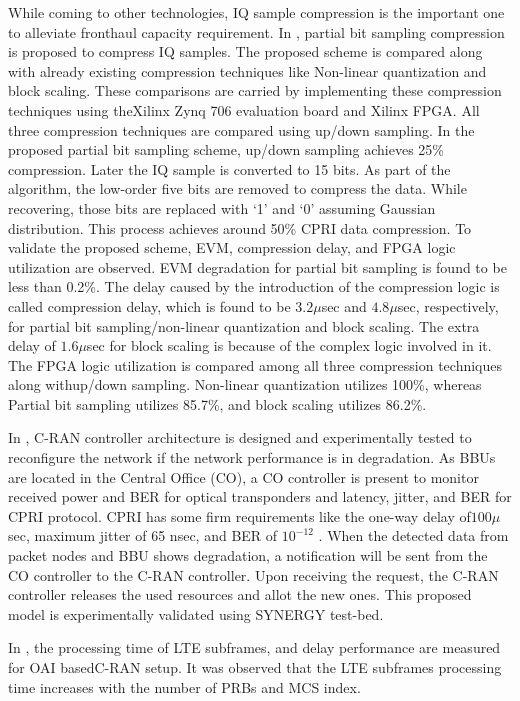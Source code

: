 \begin{multicols}{2}
\begin{itemize}
While coming to other technologies, IQ sample compression is the important one to alleviate fronthaul capacity requirement. In \cite{art3-key78}, partial bit sampling compression is proposed to compress IQ samples. The proposed scheme is compared along with already existing compression techniques like Non-linear quantization and block scaling. These comparisons are carried by implementing these compression techniques using the\break Xilinx Zynq 706 evaluation board and Xilinx FPGA. All three compression techniques are compared using up/down sampling. In the proposed partial bit sampling scheme, up/down sampling achieves 25\% compression. Later the IQ sample is converted to 15 bits. As part of the algorithm, the low-order five bits are removed to compress the data. While recovering, those bits are replaced with `1’ and `0’ assuming Gaussian distribution. This process achieves around 50\% CPRI data compression. To validate the proposed scheme, EVM, compression delay, and FPGA logic utilization are observed. EVM degradation for partial bit sampling is found to be less than 0.2\%. The delay caused by the introduction of the compression logic is called compression delay, which is found to be $3.2 \mu$sec and $4.8 \mu$sec, respectively, for partial bit sampling/non-linear quantization and block scaling. The extra delay of $1.6 \mu$sec for block scaling is because of the complex logic involved in it. The FPGA logic utilization is compared among all three compression techniques along with\break up/down sampling. Non-linear quantization utilizes 100\%, whereas Partial bit sampling utilizes 85.7\%, and block scaling utilizes 86.2\%.

In \cite{art3-key79}, C-RAN controller architecture is designed and experimentally tested to reconfigure the network if the network performance is in degradation. As BBUs are located in the Central Office (CO), a CO controller is present to monitor received power and BER for optical transponders and latency, jitter, and BER for CPRI protocol. CPRI has some firm requirements like the one-way delay of\break $100 \mu$ sec, maximum jitter of 65 nsec, and BER of $10^{−12}$ . When the detected data from packet nodes and BBU shows degradation, a notification will be sent from the CO controller to the C-RAN controller. Upon receiving the request, the C-RAN controller releases the used resources and allot the new ones. This proposed model is experimentally validated using SYNERGY test-bed.

In \cite{art3-key80}, the processing time of LTE subframes, and delay performance are measured for OAI based\break C-RAN setup. It was observed that the LTE subframes processing time increases with the number of PRBs and MCS index.


\end{itemize}
\end{multicols}
